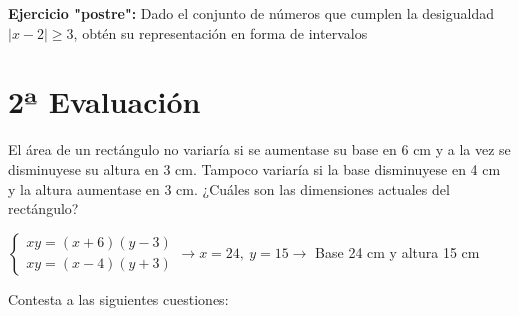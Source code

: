 \documentclass[addpoints,spanish, 12pt,a4paper]{exam}
\begin{document}
\begin{questions}

\question[1] \textbf{Ejercicio "postre":} Dado el conjunto de números que cumplen la desigualdad $|x-2|\geq 3$, obtén su representación en forma de intervalos

        


\section*{2ª Evaluación}

\question[1] El área de un rectángulo no variaría si se aumentase su base en 6 cm y a la vez se disminuyese su altura en 3 cm. Tampoco variaría si la base disminuyese en 4 cm y la altura aumentase en 3 cm. ¿Cuáles son las dimensiones actuales del rectángulo?\begin{solution} $\left\{\begin{matrix}xy=(x+6)(y-3) \\ xy=(x-4)(y+3)\end{matrix}\right. \to  x = 24, \  y = 15 \to $ Base 24 cm y altura 15 cm \end{solution}



 \question[1] Contesta a las siguientes cuestiones:\begin{parts} 
 \part  Resuelve $\dfrac{x^{2} - 4}{x^{2} - 9} \geq  0$\begin{solution} $\left(-\infty, -3\right) \cup \left[-2, 2\right] \cup \left(3, \infty\right)$\end{solution} 

\end{parts}
\end{questions}
\end{document}
